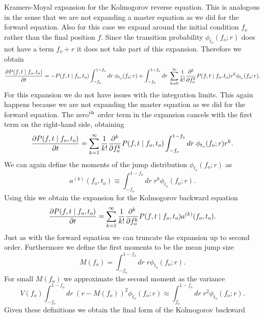 Kramers-Moyal expansion for the Kolmogorov reverse equation. This is analogous
in the sense that we are not expanding a master equation as we did for the
forward equation. Also for this case we expand around the initial condition
$f_o$ rather than the final position $f$. Since the transition probability
$\phi_{t_o}(f_o; r)$ does not have a term $f_o + r$ it does not take part of
this expansion. Therefore we obtain
\begin{equation}
	{\partial{P(f, t \mid f_o, t_o)} \over \partial t} =
	- P(f, t \mid f_o, t_o) \int_{- f_o}^{1 - f_o} dr \; \phi_{t_o}(f_o; r)
	+ \int_{-f_o}^{1 - f_o} dr\; \sum_{k=0}^{\infty} {1 \over k!}
	{\partial^k \over \partial f_o^k} P(f, t \mid f_o, t_o) r^k
	\phi_{t_o}(f_o; r).
\end{equation}
For this expansion we do not have issues with the integration limits. This
again happens because we are not expanding the master equation as we did for
the forward equation. The zero$^{\text{th}}$ order term in the expansion cancels with
the first term on the right-hand side, obtaining
\begin{equation}
	{\partial{P(f, t \mid f_o, t_o)} \over \partial t} =
	\sum_{k = 1}^{\infty} {1 \over k!} {\partial^k \over \partial f_o^k}
	P(f, t \mid f_o, t_o) \int_{-f_o}^{1 - f_o} dr\; \phi_{t_o}(f_o; r) r^k.
\end{equation}
We can again define the moments of the jump distribution $\phi_{t_o}(f_o; r)$
as
\begin{equation}
	a^{(k)}(f_o, t_o) \equiv \int_{-f_o}^{1 - f_o} dr \;
	r^k \phi_{t_o}(f_o; r).
\end{equation}
Using this we obtain the  expansion for the Kolmogorov backward equation
\begin{equation}
	{\partial{P(f, t \mid f_o, t_o)} \over \partial t} =
	\sum_{k = 1}^{\infty} {1 \over k!} {\partial^k \over \partial f_o^k}
	P(f, t \mid f_o, t_o) a^{(k)}(f_o, t_o).
\end{equation}
Just as with the forward equation we can truncate the expansion up to second
order. Furthermore we define the first moments to be the mean jump size
\begin{equation}
	M(f_o) = \int_{-f_o}^{1 - f_o} dr \; r \phi_{t_o}(f_o; r).
\end{equation}
For small $M(f_o)$ we approximate the second moment as the variance
\begin{equation}
	V(f_o) \int_{-f_o}^{1 - f_o} dr \;
	(r - M(f_o))^2 \phi_{t_o}(f_o; r) \approx
	\int_{f_o}^{1 - f_o} dr \; r^2 \phi_{t_o}(f_o; r).
\end{equation}
Given these definitions we obtain the final form of the Kolmogorov backward
